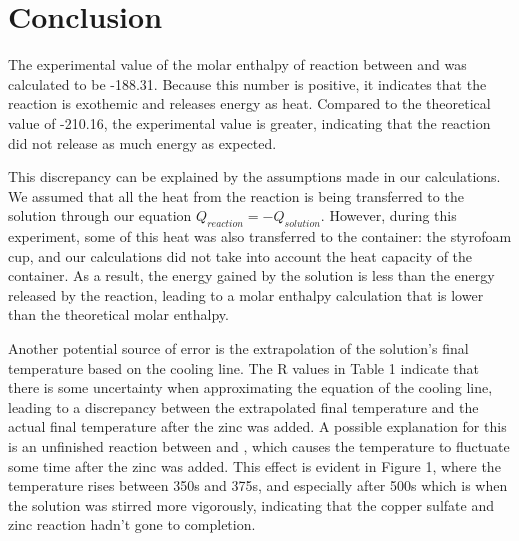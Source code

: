 \documentclass[12pt, notitlepage, letterpaper]{report}
\begin{document}
\section*{Conclusion}

The experimental value of the molar enthalpy of reaction between  and  was calculated to be -188.31\kjpmol . Because this number is positive, it indicates that the reaction is exothemic and releases energy as heat. Compared to the theoretical value of -210.16\kjpmol , the experimental value is greater, indicating that the reaction did not release as much energy as expected.

This discrepancy can be explained by the assumptions made in our calculations. We assumed that all the heat from the reaction is being transferred to the solution through our equation $Q_{reaction} = -Q_{solution}$. However, during this experiment, some of this heat was also transferred to the container: the styrofoam cup, and our calculations did not take into account the heat capacity of the container. As a result, the energy gained by the solution is less than the energy released by the reaction, leading to a molar enthalpy calculation that is lower than the theoretical molar enthalpy.

Another potential source of error is the extrapolation of the solution's final temperature based on the cooling line. The R values in Table 1 indicate that there is some uncertainty when approximating the equation of the cooling line, leading to a discrepancy between the extrapolated final temperature and the actual final temperature after the zinc was added. A possible explanation for this is an unfinished reaction between  and , which causes the temperature to fluctuate some time after the zinc was added. This effect is evident in Figure 1, where the temperature rises between 350s and 375s, and especially after 500s which is when the solution was stirred more vigorously, indicating that the copper sulfate and zinc reaction hadn't gone to completion.
\end{document}
